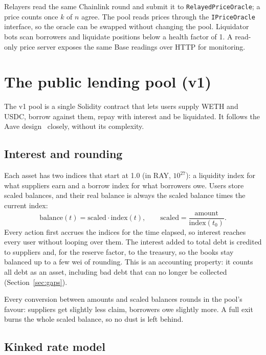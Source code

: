 \documentclass[11pt,a4paper]{article}
\newcommand{\code}[1]{\texttt{#1}}
\begin{document}
Relayers read the same Chainlink round and submit it to \code{RelayedPriceOracle}; a price counts once $k$ of
$n$ agree. The pool reads prices through the \code{IPriceOracle} interface, so the oracle can be swapped
without changing the pool. Liquidator bots scan borrowers and liquidate positions below a health factor of 1.
A read-only price server exposes the same Base readings over HTTP for monitoring.

\section{The public lending pool (v1)}

The v1 pool is a single Solidity contract that lets users supply WETH and USDC, borrow against them, repay with
interest and be liquidated. It follows the Aave design~\citep{aavev3} closely, without its complexity.

\subsection{Interest and rounding}

Each asset has two indices that start at 1.0 (in RAY, $10^{27}$): a liquidity index for what suppliers earn and
a borrow index for what borrowers owe. Users store scaled balances, and their real balance is always the scaled
balance times the current index:
\begin{equation}
  \text{balance}(t) = \text{scaled} \cdot \text{index}(t), \qquad
  \text{scaled} = \frac{\text{amount}}{\text{index}(t_0)} .
\end{equation}
Every action first accrues the indices for the time elapsed, so interest reaches every user without looping
over them. The interest added to total debt is credited to suppliers and, for the reserve factor, to the
treasury, so the books stay balanced up to a few wei of rounding. This is an accounting property: it counts all
debt as an asset, including bad debt that can no longer be collected (Section~\ref{sec:gaps}).

Every conversion between amounts and scaled balances rounds in the pool's favour: suppliers get slightly less
claim, borrowers owe slightly more. A full exit burns the whole scaled balance, so no dust is left behind.

\subsection{Kinked rate model}
\end{document}

